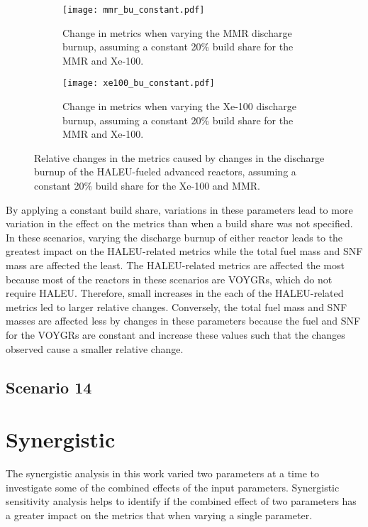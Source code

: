 \begin{figure}
    \centering
    \begin{subfigure}{0.48\textwidth}
        \centering
        \texttt{[image: mmr\_bu\_constant.pdf]}
        \caption{Change in metrics when varying the MMR discharge burnup, 
        assuming a constant 20\% build share for the MMR and Xe-100.}
        \label{fig:mmr_bu_constant}
    \end{subfigure}
    \hfill
    \begin{subfigure}{0.48\textwidth}
        \centering
        \texttt{[image: xe100\_bu\_constant.pdf]}
        \caption{Change in metrics when varying the Xe-100 discharge burnup, 
        assuming a constant 20\% build share for the MMR and Xe-100.}
        \label{fig:xe100_bu_constant}
    \end{subfigure}
    \caption{Relative changes in the metrics caused by changes in the discharge 
    burnup of the HALEU-fueled advanced reactors, assuming a constant 
    20\% build share for the Xe-100 and MMR.}
    \label{fig:bu_constant}
\end{figure}

By applying a constant build share, variations in these parameters lead to 
more variation in the effect on the metrics than when a build share was not 
specified. In these scenarios, varying the discharge burnup of either reactor 
leads to the greatest impact on the \gls{HALEU}-related metrics while the  
total fuel mass and \gls{SNF} mass are affected the least. 
The \gls{HALEU}-related metrics are affected the most because most of the reactors 
in these scenarios are VOYGRs, which do not require \gls{HALEU}. Therefore, 
small increases in the each of the \gls{HALEU}-related metrics led to larger 
relative changes. Conversely, the total fuel mass and \gls{SNF} masses are 
affected less by changes in these parameters because the fuel and \gls{SNF} 
for the VOYGRs are constant and increase these values such that the changes 
observed cause a smaller relative change. 

\subsection{Scenario 14}

\section{Synergistic}
The synergistic analysis in this work varied two parameters at a time to 
investigate some of the combined effects of the input parameters. Synergistic 
sensitivity analysis helps to identify if the combined effect of two parameters 
has a greater impact on the metrics that when varying a single parameter. 

